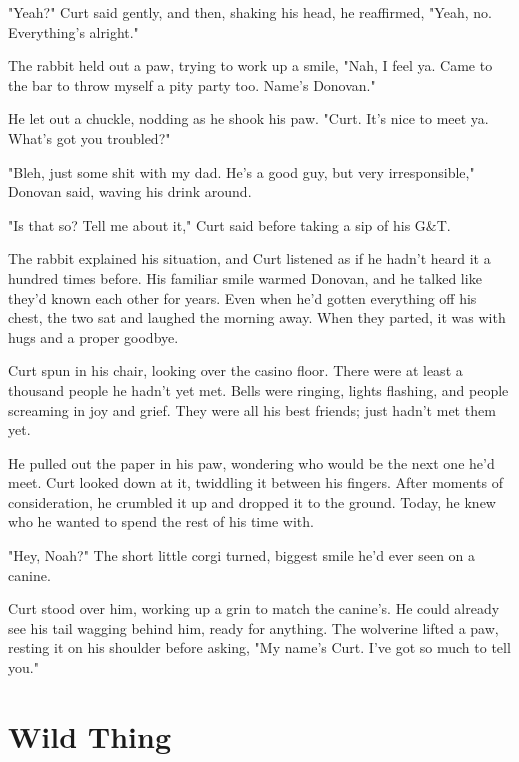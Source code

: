 "Yeah?" Curt said gently, and then, shaking his head, he reaffirmed, "Yeah, no. Everything's alright."

The rabbit held out a paw, trying to work up a smile, "Nah, I feel ya. Came to the bar to throw myself a pity party too. Name's Donovan."

He let out a chuckle, nodding as he shook his paw. "Curt. It's nice to meet ya. What's got you troubled?"

"Bleh, just some shit with my dad. He's a good guy, but very irresponsible," Donovan said, waving his drink around.

"Is that so? Tell me about it," Curt said before taking a sip of his G\&T.

The rabbit explained his situation, and Curt listened as if he hadn't heard it a hundred times before. His familiar smile warmed Donovan, and he talked like they'd known each other for years. Even when he'd gotten everything off his chest, the two sat and laughed the morning away. When they parted, it was with hugs and a proper goodbye.

Curt spun in his chair, looking over the casino floor. There were at least a thousand people he hadn't yet met. Bells were ringing, lights flashing, and people screaming in joy and grief. They were all his best friends; just hadn't met them yet.

He pulled out the paper in his paw, wondering who would be the next one he'd meet. Curt looked down at it, twiddling it between his fingers. After moments of consideration, he crumbled it up and dropped it to the ground. Today, he knew who he wanted to spend the rest of his time with.

"Hey, Noah?" The short little corgi turned, biggest smile he'd ever seen on a canine.

Curt stood over him, working up a grin to match the canine's. He could already see his tail wagging behind him, ready for anything. The wolverine lifted a paw, resting it on his shoulder before asking, "My name's Curt. I've got so much to tell you."

\cleartoverso


\chapter*{Wild Thing}


